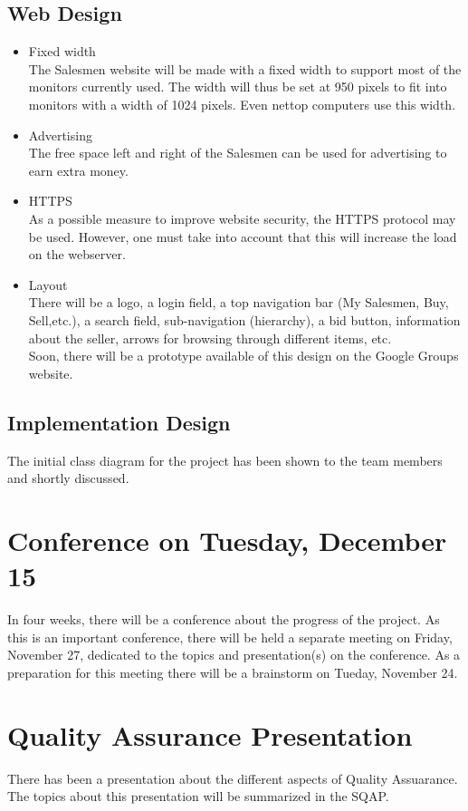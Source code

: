 \documentclass[a4paper, 12pt]{article}
\begin{document}
		\subsection{Web Design}
		\begin{itemize}
		\item Fixed width \\
The Salesmen website will be made with a fixed width to support most of the monitors currently used. The width will thus be set at 950 pixels to fit into monitors with a width of 1024 pixels. Even nettop computers use this width.
		\item Advertising \\
The free space left and right of the Salesmen can be used for advertising to earn extra money.
		\item HTTPS \\
		As a possible measure to improve website security, the HTTPS protocol
		may be used. However, one must take into account that this will
		increase the load on the webserver.
		\item Layout \\
There will be a logo, a login field, a top navigation bar (My Salesmen, Buy, Sell,etc.), a search field, sub-navigation (hierarchy), a bid button, information about the seller, arrows for browsing through different items, etc. \\
Soon, there will be a prototype available of this design on the Google Groups website.
		\end{itemize}

		\subsection{Implementation Design}
The initial class diagram for the project has been shown to the team members and shortly discussed.

	\section{Conference on Tuesday, December 15}
In four weeks, there will be a conference about the progress of the  project. As this is an important conference, there will be held a separate meeting  on Friday, November 27, dedicated to the topics and presentation(s) on the conference. As a preparation for this meeting there will be a brainstorm on Tueday, November 24.

	\section{Quality Assurance Presentation}
There has been a presentation about the different aspects of Quality Assuarance. The topics about this presentation will be summarized in the SQAP.
\end{document}
